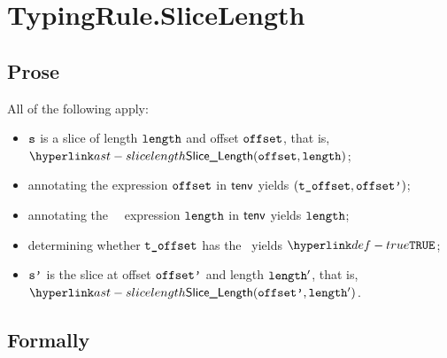 \section{TypingRule.SliceLength \label{sec:TypingRule.SliceLength}}
\subsection{Prose}
All of the following apply:
\begin{itemize}
  \item $\vs$ is a slice of length $\elength$ and offset $\eoffset$, that is, $\SliceLength(\eoffset, \elength)$;
  \item annotating the expression $\eoffset$ in $\tenv$ yields $(\toffset, \eoffsetp)$\ProseOrTypeError;
  \item annotating the \staticallyevaluable\ \constrainedinteger\ expression $\elength$ in $\tenv$ yields
  $\elength$\ProseOrTypeError;
  \item determining whether $\toffset$ has the \structureofinteger\ yields $\True$\ProseOrTypeError;
  \item $\vsp$ is the slice at offset $\eoffsetp$ and length $\elength'$, that is,\\
   $\SliceLength(\eoffsetp, \elength')$.
\end{itemize}



\subsection{Formally}
\begin{mathpar}
\end{mathpar}

